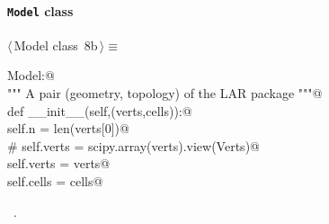 \documentclass[11pt,oneside]{article}	%
\begin{document}
\paragraph{\texttt{Model} class}
\begin{flushleft} \small \label{scrap23}
\protect{}$\langle\,$Model class\nobreak\ {\footnotesize 8b}$\,\rangle\equiv$
\vspace{-1ex}
\begin{list}{}{} \item
\mbox{}\verb@class Model:@\\
\mbox{}\verb@   """ A pair (geometry, topology) of the LAR package """@\\
\mbox{}\verb@   def __init__(self,(verts,cells)):@\\
\mbox{}\verb@      self.n = len(verts[0])@\\
\mbox{}\verb@      # self.verts = scipy.array(verts).view(Verts)@\\
\mbox{}\verb@      self.verts = verts@\\
\mbox{}\verb@      self.cells = cells@\\
\mbox{}\verb@@{\NWsep}
\end{list}
\vspace{-1ex}
\footnotesize\addtolength{\baselineskip}{-1ex}
\begin{list}{}{\setlength{\itemsep}{-\parsep}\setlength{\itemindent}{-\leftmargin}}
\item \NWtxtMacroRefIn\ .
\end{list}
\end{flushleft}
\end{document}
